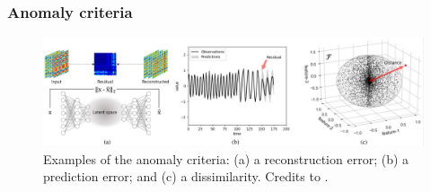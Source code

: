 \subsubsection{Anomaly criteria}
\label{ss:anomaly-criteria}
\begin{figure}[t]
\centering
\includegraphics[width=1\linewidth]{figures/introduction-2/anomaly_criteria.png}
\caption{Examples of the anomaly criteria: (a) a reconstruction error; (b) a prediction error; and (c) a dissimilarity. Credits to \cite{choi2021deep}.}
\label{fig:anomaly-criteria}
\end{figure}
